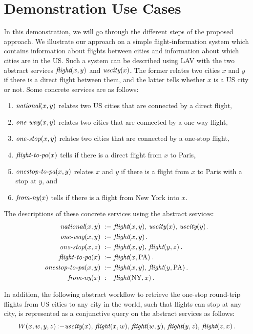 \documentclass{llncs}
\newcommand{\qrule}{:\!\!-}
\newcommand{\flight}{\text{\it flight}}
\newcommand{\UScity}{\text{\it uscity}}
\newcommand{\national}{\text{\it national}}
\newcommand{\oneway}{\text{\it one-way}}
\newcommand{\onestop}{\text{\it one-stop}}
\newcommand{\flightPA}{\text{\it flight-to-pa}}
\newcommand{\onestopPA}{\text{\it onestop-to-pa}}
\newcommand{\fromNY}{\text{\it from-ny}}
\newcommand{\PA}{\text{PA}}
\newcommand{\NY}{\text{NY}}
\begin{document}
\section{Demonstration Use Cases}
In this demonstration, we will go through the different steps of the proposed approach.
We illustrate our approach on  a simple flight-information system which contains information
about flights between cities and information about which cities are in
the US. Such a system can be described using LAV with the two abstract
services $\flight(x,y)$ and $\UScity(x)$. The former relates two cities
$x$ and $y$ if there is a direct flight between them, and the latter tells
whether $x$ is a US city or not. Some concrete services are as follows:
\begin{enumerate}[--]
\item $\national(x,y)$ relates two US cities that are connected by a direct flight,
\item $\oneway(x,y)$ relates two cities that are connected by a one-way flight,
\item $\onestop(x,y)$ relates two cities that are connected by a one-stop flight,
\item $\flightPA(x)$ tells if there is a direct flight from $x$ to Paris,
\item $\onestopPA(x,y)$ relates $x$ and $y$ if there is a flight from $x$ to Paris
      with a stop at $y$, and
\item $\fromNY(x)$ tells if there is a flight from New York into $x$.
\end{enumerate}
The descriptions of these concrete services using the abstract services:
\begin{alignat*}{1}
\national(x,y)\   &\qrule\ \flight(x,y),\,\UScity(x),\,\UScity(y)\,. \\
\oneway(x,y)\     &\qrule\ \flight(x,y)\,. \\
\onestop(x,z)\    &\qrule\ \flight(x,y),\,\flight(y,z)\,. \\
\flightPA(x)\     &\qrule\ \flight(x,\PA)\,. \\
\onestopPA(x,y)\  &\qrule\ \flight(x,y),\,\flight(y,\PA)\,. \\
\fromNY(x)\       &\qrule\ \flight(\NY,x)\,.
\end{alignat*}

In addition, the following abstract workflow to retrieve
the one-stop round-trip flights from US cities to any city in the world, such that
flights can stop at any city, is represented as a conjunctive query on the abstract services as follows: 
\[ W(x,w,y,z) \qrule \UScity(x),\,\flight(x,w),\,\flight(w,y),\,\flight(y,z),\,\flight(z,x)\,. \]
\end{document}
